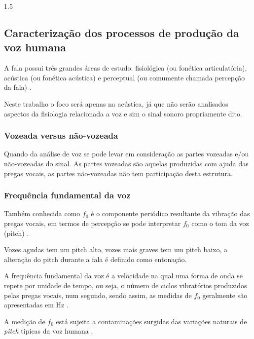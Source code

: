 \documentclass[a4paper,12pt,openright,oneside]{book}
\newenvironment{myenv}[1]
  {\begin{spacing}{#1}}
  {\end{spacing}}
\begin{document}
\begin{myenv}{1.5}
				\subsection{Caracterização dos processos de produção da voz humana}
					\par A fala possui três grandes áreas de estudo: fisiológica (ou fonética articulatória),  acústica  (ou fonética acústica)  e  perceptual  (ou  comumente  chamada percepção  da  fala) \cite{kremer2014eficiencia}.
					\par Neste trabalho o foco será apenas na acústica, já que não serão analisados aspectos da fisiologia relacionada a voz e sim o sinal sonoro propriamente dito.
					
					\subsubsection{Vozeada versus não-vozeada}

					\par Quando da análise de voz se pode levar em consideração as partes vozeadas e/ou não-vozeadas do sinal. As partes vozeadas são aquelas produzidas com ajuda das pregas vocais, as partes não-vozeadas não tem participação desta estrutura.
					
					\subsubsection{Frequência fundamental da voz}
						\par Também conhecida como $f_0$ é o componente periódico resultante da vibração das pregas vocais, em termos de percepção se pode interpretar $f_0$ como o tom da voz (pitch) \cite{kremer2014eficiencia}.
					
						\par Vozes agudas tem um pitch alto, vozes mais graves tem um pitch baixo, a alteração do pitch durante a fala é definido como entonação.
						
						\par A frequência fundamental da voz é a velocidade na qual uma forma de onda se repete
						por unidade de tempo, ou seja, o número de ciclos vibratórios produzidos pelas pregas vocais, num segundo, sendo assim, as medidas de $f_0$ geralmente são apresentadas em Hz \cite{freitas2013avaliaccao}.
					
						\par A medição de $f_0$ está sujeita a contaminações surgidas das variações naturais de \textit{pitch} tipicas da voz humana \cite{freitas2013avaliaccao}.
						

\end{myenv}
\end{document}
